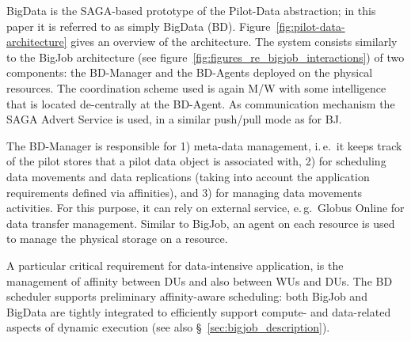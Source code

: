 BigData is the SAGA-based prototype of the Pilot-Data
abstraction; in this paper it is referred to as simply
BigData (BD).  Figure~\ref{fig:pilot-data-architecture} gives an
overview of the architecture.  The system consists similarly to the BigJob 
architecture (see figure~\ref{fig:figures_re_bigjob_interactions}) of two 
components: the BD-Manager and the BD-Agents deployed on the physical
resources. The coordination scheme used is again M/W with some
intelligence that is located de-centrally at the BD-Agent. As
communication mechanism the SAGA Advert Service is used, in a similar
push/pull mode as for BJ.

The BD-Manager is responsible for 1) meta-data management, i.\,e.\ it
keeps track of the pilot stores that a pilot data object is associated
with, 2) for scheduling data movements and data replications (taking
into account the application requirements defined via affinities), and
3) for managing data movements activities. For this purpose, it can rely
on external service, e.\,g.\ Globus Online for data transfer management.  
Similar to BigJob, an agent on each resource is used to manage the physical 
storage on a resource.  

A particular critical requirement for data-intensive application, is
the management of affinity between DUs and also between WUs and
DUs. The BD scheduler supports preliminary affinity-aware
scheduling: both BigJob and BigData are tightly integrated to
efficiently support compute- and data-related aspects of dynamic
execution (see also \S~\ref{sec:bigjob_description}).
 




